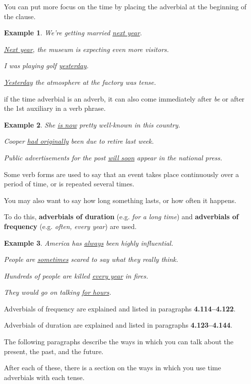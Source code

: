 \documentclass[oneside]{book}
\numberwithin{equation}{section}
\newtheorem{example}{Example}[section]
\begin{document}
You can put more focus on the time by placing the adverbial at the beginning of the clause.
\begin{example}
    We're getting married \underline{next year}.
    
    \underline{Next year}, the museum is expecting even more visitors.
    
    I was playing golf \underline{yesterday}.
    
    \underline{Yesterday} the atmosphere at the factory was tense.
\end{example}
if the time adverbial is an adverb, it can also come immediately after \textit{be} or after the 1st auxiliary in a verb phrase.
\begin{example}
    She \underline{is now} pretty well-known in this country.
    
    Cooper \underline{had originally} been due to retire last week.
    
    Public advertisements for the post \underline{will soon} appear in the national press.
\end{example}
%
\noindent{} Some verb forms are used to say that an event takes place continuously over a period of time, or is repeated several times.

You may also want to say how long something lasts, or how often it happens.

To do this, \textbf{adverbials of duration} (e.g. \textit{for a long time}) and \textbf{adverbials of frequency} (e.g. \textit{often, every year}) are used.
\begin{example}
    America has \underline{always} been highly influential.
    
    People are \underline{sometimes} scared to say what they really think.
    
    Hundreds of people are killed \underline{every year} in fires.
    
    They would go on talking \underline{for hours}.
\end{example}
Adverbials of frequency are explained and listed in paragraphs \textbf{4.114--4.122}.

Adverbials of duration are explained and listed in paragraphs \textbf{4.123--4.144}.

%
\noindent{} The following paragraphs describe the ways in which you can talk about the present, the past, and the future.

After each of these, there is a section on the ways in which you use time adverbials with each tense.
\end{document}
